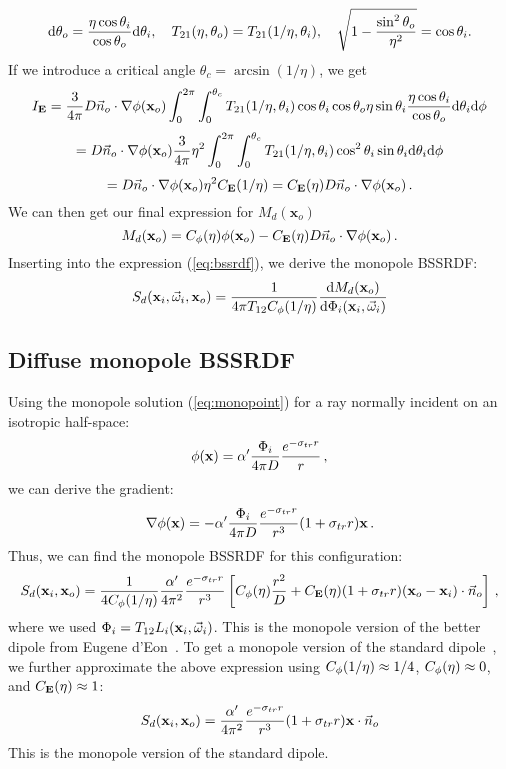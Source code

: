 \documentclass[10pt,a4paper]{article}
\begin{document}
$$
\text{d} \theta_o = \frac{\eta \cos\theta_i}{\cos\theta_o} \text{d} \theta_i,\ \ \ T_{21}(\eta,\theta_o) = T_{21}(1/\eta,\theta_i),\ \ \ \sqrt{1 - \frac{\sin^2\theta_o}{\eta^2}} = \cos\theta_i.
$$
If we introduce a critical angle $\theta_c = \arcsin(1/\eta)$, we get
$$
I_{\mathbf{E}} = \frac{3}{4\pi} D \vec{n}_o\cdot\nabla\phi(\mathbf{x}_o) \int_{0}^{2\pi}\int_{0}^{\theta_c} T_{21}(1/\eta,\theta_i) \cos\theta_i \cos \theta_o \eta \sin \theta_i \frac{\eta \cos\theta_i}{\cos\theta_o} \text{d} \theta_i \text{d} \phi
$$
$$
= D \vec{n}_o\cdot\nabla\phi(\mathbf{x}_o) \frac{3}{4\pi} \eta^2 \int_{0}^{2\pi}\int_{0}^{\theta_c} T_{21}(1/\eta,\theta_i) \cos^2\theta_i \sin \theta_i \text{d} \theta_i \text{d} \phi
$$
$$
= D \vec{n}_o\cdot\nabla\phi(\mathbf{x}_o) \eta^2 C_{\mathbf{E}}(1/\eta) = C_{\mathbf{E}}(\eta) D \vec{n}_o\cdot\nabla\phi(\mathbf{x}_o) \, .
$$
We can then get our final expression for  $M_d(\mathbf{x}_o)$
$$
M_d(\mathbf{x}_o) =  C_{\phi}(\eta) \phi(\mathbf{x}_o) - C_{\mathbf{E}}(\eta) D \vec{n}_o\cdot\nabla\phi(\mathbf{x}_o) \, .
$$
Inserting into the expression (\ref{eq:bssrdf}), we derive the monopole BSSRDF:
$$
S_d(\mathbf{x}_i, \vec{\omega}_i, \mathbf{x}_o)  =  \frac{1}{4\pi T_{12}C_{\phi}(1/\eta)} \frac{\text{d} M_d(\mathbf{x}_o)}{\text{d} \Phi_i(\mathbf{x}_i, \vec{\omega}_i)}
$$

\subsection{Diffuse monopole BSSRDF}

Using the monopole solution (\ref{eq:monopoint}) for a ray normally incident on an isotropic half-space:
$$
{\phi}(\mathbf{x}) = \alpha' \frac{\Phi_i}{4 \pi D} \frac{e^{-\sigma_{tr} r}}{r} \, ,
$$
we can derive the gradient:
$$
\nabla {\phi}(\mathbf{x}) =  -\alpha'\frac{\Phi_i}{4 \pi D} \frac{e^{-\sigma_{tr} r}}{r^3} (1 + \sigma_{tr} r) \mathbf{x} \, .
$$
Thus, we can find the monopole BSSRDF for this configuration:
$$
S_d(\mathbf{x}_i, \mathbf{x}_o)  = \frac{1}{4C_{\phi}(1/\eta)} \frac{\alpha'}{4 \pi^2} \frac{e^{-\sigma_{tr} r}}{r^3} \left[ C_{\phi}(\eta) \frac{r^2}{D} + C_{\mathbf{E}}(\eta) (1 + \sigma_{tr} r) (\mathbf{x}_o - \mathbf{x}_i) \cdot \vec{n}_o \right] \, ,
$$
where we used $\Phi_i = T_{12} L_i(\mathbf{x}_i, \vec{\omega}_i)$. This is the monopole version of the better dipole from Eugene d'Eon~\cite{deon12}. To get a monopole version of the standard dipole~\cite{farrell92,jensen01}, we further approximate the above expression using $C_{\phi}(1/\eta) \approx 1/4$, $C_{\phi}(\eta) \approx 0$, and $C_{\mathbf{E}}(\eta) \approx 1$:
$$
S_d(\mathbf{x}_i, \mathbf{x}_o)  =  \frac{\alpha'}{4 \pi^2} \frac{e^{-\sigma_{tr} r}}{r^3} (1 + \sigma_{tr} r) \mathbf{x} \cdot \vec{n}_o
$$
This is the monopole version of the standard dipole.
\end{document}
